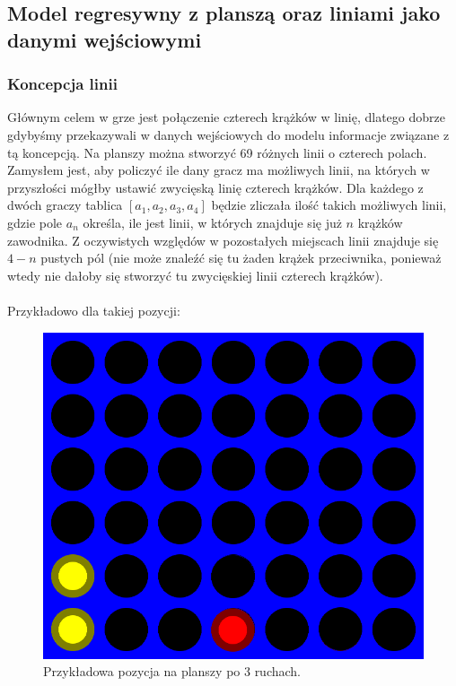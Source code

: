 \documentclass[12pt]{article}
\begin{document}
\clearpage

\subsection{Model regresywny z planszą oraz liniami jako danymi wejściowymi}

\subsubsection{Koncepcja linii}
Głównym celem w grze jest połączenie czterech krążków w linię, dlatego dobrze gdybyśmy przekazywali w danych wejściowych do modelu informacje związane z tą koncepcją. Na planszy można stworzyć 69 różnych linii o czterech polach. Zamysłem jest, aby policzyć ile dany gracz ma możliwych linii, na których w przyszłości mógłby ustawić zwycięską linię czterech krążków. Dla każdego z dwóch graczy tablica $[a_1, a_2, a_3, a_4]$ będzie zliczała ilość takich możliwych linii, gdzie pole $a_n$ określa, ile jest linii, w których znajduje się już $n$ krążków zawodnika. Z oczywistych względów w pozostałych miejscach linii znajduje się $4 - n$ pustych pól (nie może znaleźć się tu żaden krążek przeciwnika, ponieważ wtedy nie dałoby się stworzyć tu zwycięskiej linii czterech krążków).
\\ \\
Przykładowo dla takiej pozycji:
\begin{figure}[!ht]
    \centering
    \includegraphics[scale=0.40]{example.png}
    \caption{Przykładowa pozycja na planszy po 3 ruchach.}
\end{figure}
\end{document}
